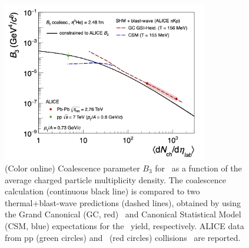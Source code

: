 \documentclass{appolb}
\begin{document}
\begin{figure}[htb]
\begin{center}
\includegraphics[width=0.8\textwidth]{B3vsMult073.png}
\caption{(Color online) Coalescence parameter $B_3$ for \hethree~as a function of the average charged particle multiplicity density. The coalescence calculation (continuous black line) is compared to two thermal+blast-wave predictions (dashed lines), obtained by using the Grand Canonical (GC, red)~\cite{Andronic:2017} and Canonical Statistical Model (CSM, blue) \cite{Vovchenko:2018fiy} expectations for the \hethree~yield, respectively. ALICE data from pp (green circles) and \PbPb~(red circles) collisions~\cite{ALICE:nucleipp2017,ALICE:deuteronppPbPb2015} are reported. }
\label{Fig:3He}
\end{center}
\end{figure} 
\end{document}
